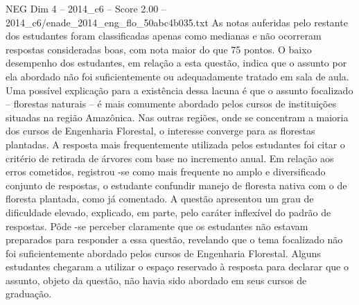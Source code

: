 \begin{textsample}{NEG Dim 4 – 2014\_c6 – Score 2.00 – 2014\_c6/enade\_2014\_eng\_flo\_50abc4b035.txt}
As notas auferidas pelo restante dos estudantes foram classificadas apenas como medianas e não ocorreram respostas consideradas boas, com nota maior do que 75 pontos.
O baixo desempenho dos estudantes, em relação a esta questão, indica que o assunto por ela abordado não foi suficientemente ou adequadamente tratado em sala de aula.
Uma possível explicação para a existência dessa lacuna é que o assunto focalizado – florestas naturais – é mais comumente abordado pelos cursos de instituições situadas na região Amazônica.
Nas outras regiões, onde se concentram a maioria dos cursos de Engenharia Florestal, o interesse converge para as florestas plantadas.
A resposta mais frequentemente utilizada pelos estudantes foi citar o critério de retirada de árvores com base no incremento anual.
Em relação aos erros cometidos, registrou -se como mais frequente no amplo e diversificado conjunto de respostas, o estudante confundir manejo de floresta nativa com o de floresta plantada, como já comentado.
A questão apresentou um grau de dificuldade elevado, explicado, em parte, pelo caráter inflexível do padrão de respostas.
Pôde -se perceber claramente que os estudantes não estavam preparados para responder a essa questão, revelando que o tema focalizado não foi suficientemente abordado pelos cursos de Engenharia Florestal.
Alguns estudantes chegaram a utilizar o espaço reservado à resposta para declarar que o assunto, objeto da questão, não havia sido abordado em seus cursos de graduação.

\end{textsample}
